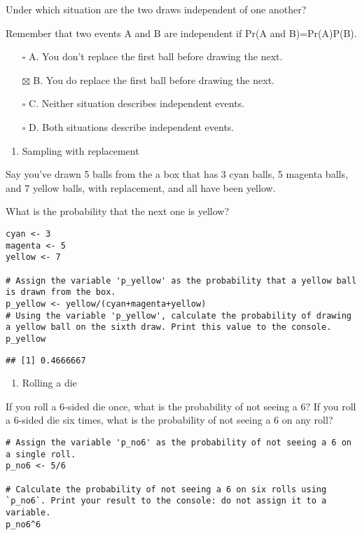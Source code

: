 \documentclass[
]{article}
\providecommand{\tightlist}{%
  \setlength{\itemsep}{0pt}\setlength{\parskip}{0pt}}
\begin{document}
Under which situation are the two draws independent of one another?

Remember that two events A and B are independent if Pr(A and
B)=Pr(A)P(B).

\begin{itemize}
\tightlist
\item[$\square$]
  A. You don't replace the first ball before drawing the next.
\item[$\boxtimes$]
  B. You do replace the first ball before drawing the next.
\item[$\square$]
  C. Neither situation describes independent events.
\item[$\square$]
  D. Both situations describe independent events.
\end{itemize}

\begin{enumerate}
\def\labelenumi{\arabic{enumi}.}
\setcounter{enumi}{1}
\tightlist
\item
  Sampling with replacement
\end{enumerate}

Say you've drawn 5 balls from the a box that has 3 cyan balls, 5 magenta
balls, and 7 yellow balls, with replacement, and all have been yellow.

What is the probability that the next one is yellow?

\begin{verbatim}
cyan <- 3
magenta <- 5
yellow <- 7

# Assign the variable 'p_yellow' as the probability that a yellow ball is drawn from the box.
p_yellow <- yellow/(cyan+magenta+yellow)
# Using the variable 'p_yellow', calculate the probability of drawing a yellow ball on the sixth draw. Print this value to the console.
p_yellow
\end{verbatim}

\begin{verbatim}
## [1] 0.4666667
\end{verbatim}

\begin{enumerate}
\def\labelenumi{\arabic{enumi}.}
\setcounter{enumi}{2}
\tightlist
\item
  Rolling a die
\end{enumerate}

If you roll a 6-sided die once, what is the probability of not seeing a
6? If you roll a 6-sided die six times, what is the probability of not
seeing a 6 on any roll?

\begin{verbatim}
# Assign the variable 'p_no6' as the probability of not seeing a 6 on a single roll.
p_no6 <- 5/6

# Calculate the probability of not seeing a 6 on six rolls using `p_no6`. Print your result to the console: do not assign it to a variable.
p_no6^6
\end{verbatim}
\end{document}
